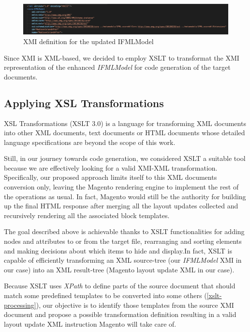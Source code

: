 \vspace{0.5cm}
\begin{figure}[H]
  \centering
    \includegraphics[width=15cm]{images/xmi-header.png}
  \caption{XMI definition for the updated IFMLModel}
  \label{fig:xmi-header}
\end{figure}
\vspace{0.5cm}


Since XMI is XML-based, we decided to employ XSLT to transformat the XMI representation of the enhanced \textit{IFMLModel} for code generation of the target documents. 

\subsection{Applying XSL Transformations}

XSL Transformations (XSLT 3.0) is a language for transforming XML documents into other XML documents, text documents or HTML documents\cite{xslt} whose detailed language specifications are beyond the scope of this work.

Still, in our journey towards code generation, we considered XSLT a suitable tool because we are effectively looking for a valid XMI-XML transformation. Specifically, our proposed approach limits itself to this XML documents conversion only, leaving the Magento rendering engine to implement the rest of the operations as usual. In fact, Magento would still be the authority for building up the final HTML response after merging all the layout updates collected and recursively rendering all the associated block templates.

The goal described above is achievable thanks to XSLT functionalities for adding nodes and attributes to or from the target file, rearranging and sorting elements and making decisions about which items to hide and display.In fact, XSLT is capable of efficiently transforming an XML source-tree (our \textit{IFMLModel} XMI in our case) into an XML result-tree (Magento layout update XML in our case).

Because XSLT uses \textit{XPath} to define parts of the source document that should match some predefined templates to be converted into some others (\ref{xslt-processing}), our objective is to identify those templates from the source XMI document and propose a possible transformation definition resulting in a valid layout update XML instruction Magento will take care of.

